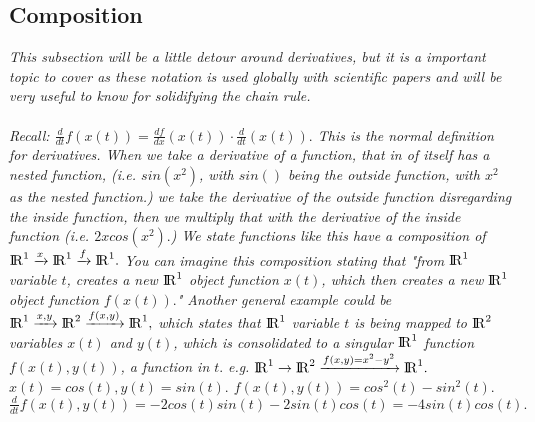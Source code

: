 \documentclass[addpoints]{exam}
\begin{document}
\subsection{
Composition
}
\textit{
This subsection will be a little detour around derivatives, but it is a important topic to cover as these notation is used globally with scientific papers and will be very useful to know for solidifying the chain rule.\\\\
Recall: $\frac{d}{dt}f(x(t))=\frac{df}{dx}(x(t))\cdot \frac{d}{dt}(x(t)).$ This is the normal definition for derivatives. When we take a derivative of a function, that in of itself has a nested function, (i.e. $sin(x^2)$, with $sin()$ being the outside function, with $x^2$ as the nested function.) we take the derivative of the outside function disregarding the inside function, then we multiply that with the derivative of the inside function (i.e. $2xcos(x^2).$) We state functions like this have a composition of ${\rm I\!R}^1\xrightarrow{x}{\rm I\!R}^1\xrightarrow{f}{\rm I\!R}^1.$ You can imagine this composition stating that "from ${\rm I\!R}^1$ variable $t$, creates a new ${\rm I\!R}^1$ object function $x(t)$, which then creates a new ${\rm I\!R}^1$ object function $f(x(t)).$" Another general example could be ${\rm I\!R}^1\xrightarrow{x,y}{\rm I\!R}^2\xrightarrow{f(x,y)}{\rm I\!R}^1,$ which states that ${\rm I\!R}^1$ variable $t$ is being mapped to ${\rm I\!R}^2$ variables $x(t)$ and $y(t)$, which is consolidated to a singular ${\rm I\!R}^1$ function $f(x(t),y(t))$, a function in $t.$
}
\textit{
e.g. ${\rm I\!R}^1\rightarrow{\rm I\!R}^2\xrightarrow{f(x,y)=x^2-y^2}{\rm I\!R}^1.$ $x(t)=cos(t), y(t)=sin(t).$ $f(x(t),y(t))=cos^2(t)-sin^2(t).$ $\frac{d}{dt}f(x(t),y(t))=-2cos(t)sin(t)-2sin(t)cos(t)=-4sin(t)cos(t).$
}
\end{document}
